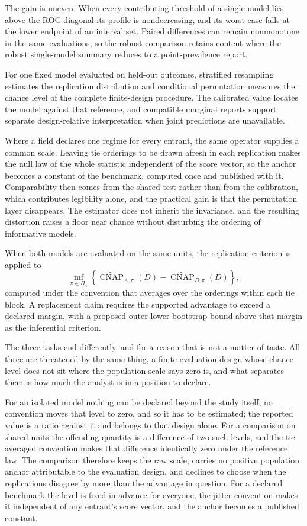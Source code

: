 \documentclass[11pt]{article}
\newcommand{\CNAP}{\operatorname{CNAP}}
\newcommand{\PSet}{\Pi_\star}
\newcommand{\CNAPta}{\widetilde{\CNAP}}
\theoremstyle{remark}
\begin{document}
The gain is uneven. When every contributing threshold of a single model lies above the ROC diagonal its profile is nondecreasing, and its worst case falls at the lower endpoint of an interval set. Paired differences can remain nonmonotone in the same evaluations, so the robust comparison retains content where the robust single-model summary reduces to a point-prevalence report.

For one fixed model evaluated on held-out outcomes, stratified resampling estimates the replication distribution and conditional permutation measures the chance level of the complete finite-design procedure. The calibrated value locates the model against that reference, and compatible marginal reports support separate design-relative interpretation when joint predictions are unavailable.

Where a field declares one regime for every entrant, the same operator supplies a common scale. Leaving tie orderings to be drawn afresh in each replication makes the null law of the whole statistic independent of the score vector, so the anchor becomes a constant of the benchmark, computed once and published with it. Comparability then comes from the shared test rather than from the calibration, which contributes legibility alone, and the practical gain is that the permutation layer disappears. The estimator does not inherit the invariance, and the resulting distortion raises a floor near chance without disturbing the ordering of informative models.

When both models are evaluated on the same units, the replication criterion is applied to
\[
\inf_{\pi\in\PSet}
\left\{
\CNAPta_{A,\pi}(D)-\CNAPta_{B,\pi}(D)
\right\},
\]
computed under the convention that averages over the orderings within each tie block. A replacement claim requires the supported advantage to exceed a declared margin, with a proposed outer lower bootstrap bound above that margin as the inferential criterion.

The three tasks end differently, and for a reason that is not a matter of taste. All three are threatened by the same thing, a finite evaluation design whose chance level does not sit where the population scale says zero is, and what separates them is how much the analyst is in a position to declare.

For an isolated model nothing can be declared beyond the study itself, no convention moves that level to zero, and so it has to be estimated; the reported value is a ratio against it and belongs to that design alone. For a comparison on shared units the offending quantity is a difference of two such levels, and the tie-averaged convention makes that difference identically zero under the reference law. The comparison therefore keeps the raw scale, carries no positive population anchor attributable to the evaluation design, and declines to choose when the replications disagree by more than the advantage in question. For a declared benchmark the level is fixed in advance for everyone, the jitter convention makes it independent of any entrant's score vector, and the anchor becomes a published constant.
\end{document}
